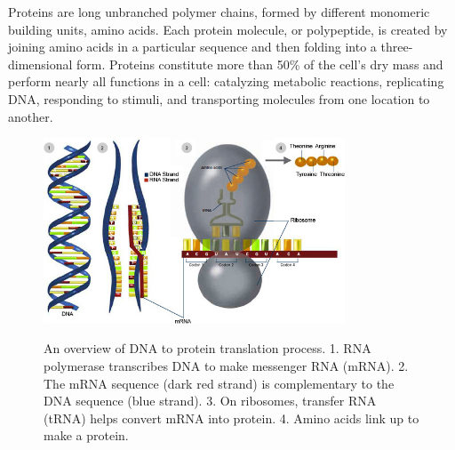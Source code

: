 \documentclass[11pt, a4paper,oneside]{report}
\begin{document}
Proteins are long unbranched polymer chains, formed by different monomeric building units, amino acids. Each protein molecule, or polypeptide, is created by joining amino acids in a particular sequence and then folding into a three-dimensional form. Proteins constitute more than 50\%  of the cell's dry mass \cite{Alberts2007} and perform nearly all functions in a cell: catalyzing metabolic reactions, replicating DNA, responding to stimuli, and transporting molecules from one location to another.
\begin{figure}[ht]
\begin{center}
\label{img:dnatoprotein}
\includegraphics[width=0.8\textwidth]{figures/dna_to_protein.jpg}
\end{center}
\caption{An overview of DNA to protein translation process. 1. RNA polymerase transcribes DNA to make messenger RNA (mRNA). 2. The mRNA sequence (dark red strand) is complementary to the DNA sequence (blue strand). 3. On ribosomes, transfer RNA (tRNA) helps convert mRNA into protein. 4. Amino acids link up to make a protein.} 
\end{figure}
\end{document}
